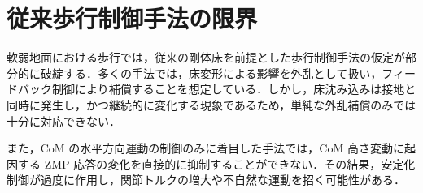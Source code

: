 \section{従来歩行制御手法の限界}

軟弱地面における歩行では，従来の剛体床を前提とした歩行制御手法の仮定が部分的に破綻する．多くの手法では，床変形による影響を外乱として扱い，フィードバック制御により補償することを想定している．しかし，床沈み込みは接地と同時に発生し，かつ継続的に変化する現象であるため，単純な外乱補償のみでは十分に対応できない．

また，CoM の水平方向運動の制御のみに着目した手法では，CoM 高さ変動に起因する ZMP 応答の変化を直接的に抑制することができない．その結果，安定化制御が過度に作用し，関節トルクの増大や不自然な運動を招く可能性がある．